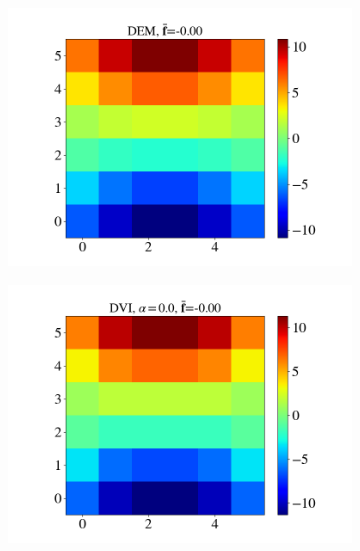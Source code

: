 \begin{itemize}
\begin{figure}[H]
\begin{subfigure}{0.32\columnwidth}
			\centering
			\includegraphics[width=1.0\textwidth]{images/CD/Example7/5/T1_6_DEM_0.png}
		\end{subfigure}
		\begin{subfigure}{0.32\columnwidth}	
			\centering
			\includegraphics[width=1.0\textwidth]{images/CD/Example7/5/T1_6_DVI_0.0.png}
		\end{subfigure}
		\begin{subfigure}{0.32\columnwidth}	
			\centering

\end{subfigure}
\end{figure}
\end{itemize}
